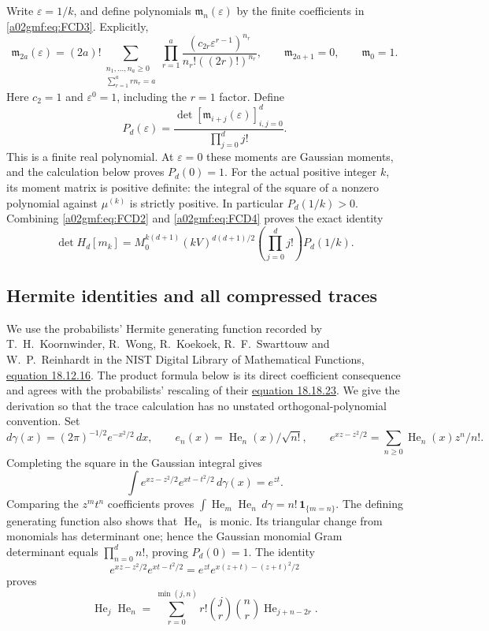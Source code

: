 Write \(\varepsilon=1/k\), and define polynomials \(\mathfrak m_n(\varepsilon)\)
by the finite coefficients in \eqref{a02gmf:eq:FCD3}. Explicitly,
\[
 \mathfrak m_{2a}(\varepsilon)
 =(2a)!\!
 \sum_{\substack{n_1,\ldots,n_a\ge0\\
                         \sum_{r=1}^a r n_r=a}}
 \prod_{r=1}^a
  \frac{(c_{2r}\varepsilon^{r-1})^{n_r}}
       {n_r!((2r)!)^{n_r}},
 \qquad \mathfrak m_{2a+1}=0,\qquad \mathfrak m_0=1.
\]
Here \(c_2=1\) and \(\varepsilon^0=1\), including the \(r=1\) factor.
Define
\begin{equation}
 P_d(\varepsilon)=
 \frac{\det[\mathfrak m_{i+j}(\varepsilon)]_{i,j=0}^{d}}
      {\prod_{j=0}^d j!}.
 \tag{FCD4}\label{a02gmf:eq:FCD4}
\end{equation}
This is a finite real polynomial. At \(\varepsilon=0\) these moments are
Gaussian moments, and the calculation below proves \(P_d(0)=1\).
For the actual positive integer \(k\), its moment matrix is positive
definite: the integral of the square of a nonzero polynomial against
\(\mu^{(k)}\) is strictly positive. In particular \(P_d(1/k)>0\).
Combining \eqref{a02gmf:eq:FCD2} and \eqref{a02gmf:eq:FCD4} proves the exact identity
\begin{equation}
 \boxed{\displaystyle
 \det H_d[m_k]=M_0^{k(d+1)}(kV)^{d(d+1)/2}
                    \left(\prod_{j=0}^d j!\right)P_d(1/k).}
 \tag{FCD5}\label{a02gmf:eq:FCD5}
\end{equation}

\subsection{Hermite identities and all compressed traces}

We use the probabilists' Hermite generating function recorded by
T.~H.~Koornwinder, R.~Wong, R.~Koekoek, R.~F.~Swarttouw and
W.~P.~Reinhardt in the NIST Digital Library of Mathematical Functions,
\href{https://dlmf.nist.gov/18.12.E16}{equation 18.12.16}.
The product formula below is its direct coefficient consequence and agrees
with the probabilists' rescaling of their
\href{https://dlmf.nist.gov/18.18.E23}{equation 18.18.23}.
We give the derivation so that the trace calculation has no unstated
orthogonal-polynomial convention.
Set
\[
 d\gamma(x)=(2\pi)^{-1/2}e^{-x^2/2}\,dx,\qquad
 e_n(x)=\operatorname{He}_n(x)/\sqrt{n!},\qquad
 e^{xz-z^2/2}=\sum_{n\ge0}\operatorname{He}_n(x)z^n/n!.
\]
Completing the square in the Gaussian integral gives
\[
 \int e^{xz-z^2/2}e^{xt-t^2/2}\,d\gamma(x)=e^{zt}.
\]
Comparing the \(z^mt^n\) coefficients proves
\(\int \operatorname{He}_m\operatorname{He}_n\,d\gamma
   =n!\,\mathbf1_{\{m=n\}}\).
The defining generating function also shows that
\(\operatorname{He}_n\) is monic. Its triangular change from monomials has
determinant one; hence the Gaussian monomial Gram determinant equals
\(\prod_{n=0}^d n!\), proving \(P_d(0)=1\).
The identity
\[
 e^{xz-z^2/2}e^{xt-t^2/2}
    =e^{zt}e^{x(z+t)-(z+t)^2/2}
\]
proves
\begin{equation}
 \operatorname{He}_j\operatorname{He}_n
   =\sum_{r=0}^{\min(j,n)}
       r!\binom jr\binom nr\operatorname{He}_{j+n-2r}.
 \tag{FCD6}\label{a02gmf:eq:FCD6}
\end{equation}

